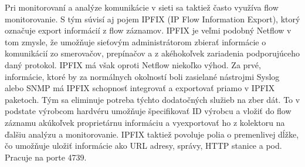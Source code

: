 Pri monitorovaní a analýze komunikácie v sieti sa taktiež často využíva flow monitorovanie. S tým súvisí aj pojem IPFIX (IP Flow Information Export), ktorý označuje export informácií z flow záznamov. IPFIX je veľmi podobný Netflow v tom zmysle, že umožňuje sieťovým administrátorom zbierať informácie o komunikácií zo smerovačov, prepínačov a z akéhokoľvek zariadenia podporujúceho daný protokol. IPFIX má však oproti Netflow niekoľko výhod. Za prvé, informácie, ktoré by za normálnych okolností boli zasielané nástrojmi Syslog alebo SNMP má IPFIX schopnosť integrovať a exportovať priamo v IPFIX paketoch. Tým sa eliminuje potreba týchto dodatočných služieb na zber dát. To v podstate výrobcom hardvéru umožňuje špecifikovať ID výrobcu a vložiť do flow záznamu akúkoľvek proprietárnu informáciu a vyexportovať ho z kolektoru na ďalšiu analýzu a monitorovanie. IPFIX taktiež povoluje polia o premenlivej dĺžke, čo umožňuje uložiť informácie ako URL adresy, správy, HTTP stanice a pod. Pracuje na porte 4739.



